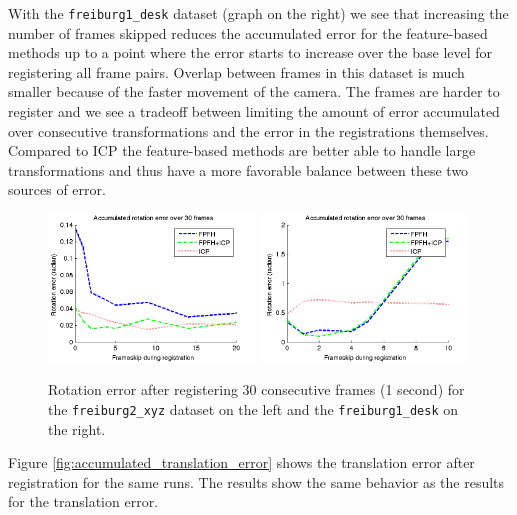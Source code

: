 \documentclass[a4paper]{article}
\begin{document}
With the \texttt{freiburg1\_desk} dataset (graph on the right) we see that increasing the number of frames skipped reduces the accumulated error for the feature-based methods up to a point where the error starts to increase over the base level for registering all frame pairs. Overlap between frames in this dataset is much smaller because of the faster movement of the camera. The frames are harder to register and we see a tradeoff between limiting the amount of error accumulated over consecutive transformations and the error in the registrations themselves. Compared to \ac{ICP} the feature-based methods are better able to handle large transformations and thus have a more favorable balance between these two sources of error.

\begin{figure}[htbp]
    \centering
        \includegraphics[width=0.49\textwidth]{ims/xyzAccumulatedrotationerrorover30frames.png}
        \includegraphics[width=0.49\textwidth]{ims/deskAccumulatedrotationerrorover30frames.png}
    \caption{Rotation error after registering 30 consecutive frames (1 second) for the  \texttt{freiburg2\_xyz} dataset on the left and the \texttt{freiburg1\_desk} on the right.}
    \label{fig:accumulated_rotation_error}
\end{figure}

Figure \ref{fig:accumulated_translation_error} shows the translation error after registration for the same runs. The results show the same behavior as the results for the translation error. 
\end{document}
